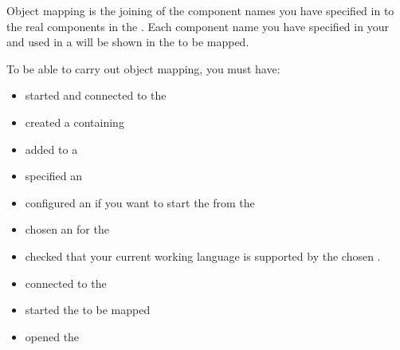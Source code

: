 

Object mapping is the joining of the component names you have specified in \gdsteps{} to the real components in the \gdaut{}. Each component name you have specified in your \gdcases{} and used in a \gdsuite{} will be shown in the \gdomeditor{} to be mapped. 


To be able to carry out object mapping, you must have:

\begin{itemize}
\item started and connected to the \gdagent{} 
\item created a \gdcase{} containing \gdsteps{} 
\item added \gdcases to a \gdsuite{} 
\item specified an \gdaut{}  
\item configured an \gdaut{} if you want to start the \gdaut{} from the \ite{} 
\item chosen an \gdaut{} for the \gdsuite{} 
\item checked that your current working language is supported by the chosen \gdaut{}. 
\item connected to the \gdagent{} 
\item started the \gdaut{} to be mapped 
\item opened the \gdomeditor{} 
\end{itemize}

